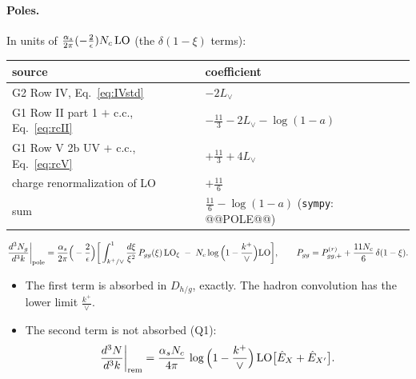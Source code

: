 \documentclass[10pt]{article}
\numberwithin{equation}{section}
\newcommand{\Lv}{L_{\vee}}
\newcommand{\Eh}{\hat E}
\begin{document}
\paragraph{Poles.} In units of $\frac{\alpha_s}{2\pi}(-\frac2\epsilon)N_c\,{\rm LO}$ (the $\delta(1-\xi)$ terms):
\begin{center}\small
\begin{tabular}{@{}ll@{}}\toprule
source & coefficient\\\midrule
G2 Row IV, Eq.~\eqref{eq:IVstd} & $-2\Lv$\\
G1 Row II part 1 $+$ c.c., Eq.~\eqref{eq:rcII} & $-\frac{11}{3}-2\Lv-\log(1-a)$\\
G1 Row V 2b UV $+$ c.c., Eq.~\eqref{eq:rcV} & $+\frac{11}{3}+4\Lv$\\
charge renormalization of LO & $+\frac{11}{6}$\\\midrule
sum & $\frac{11}{6}-\log(1-a)$ \quad(\texttt{sympy}: @@POLE@@)\\\bottomrule
\end{tabular}
\end{center}
\begin{equation}
\frac{d^3N_g}{d^3k}\bigg|_{\rm pole}=\frac{\alpha_s}{2\pi}\Big(-\frac{2}{\epsilon}\Big)\bigg[\int_{k^+/\vee}^1\frac{d\xi}{\xi^2}\,P_{gg}(\xi)\,{\rm LO}_\xi\;-\;N_c\log\Big(1-\frac{k^+}{\vee}\Big){\rm LO}\bigg],\qquad P_{gg}=P^{(r)}_{gg,+}+\frac{11N_c}{6}\,\delta(1-\xi).
\label{eq:pole}
\end{equation}
\begin{itemize}
\item The first term is absorbed in $D_{h/g}$, exactly. The hadron convolution has the lower limit $\frac{k^+}{\vee}$.
\item The second term is not absorbed (Q1):
\begin{equation}
\frac{d^3N}{d^3k}\bigg|_{\rm rem}=\frac{\alpha_sN_c}{4\pi}\,\log\Big(1-\frac{k^+}{\vee}\Big)\,{\rm LO}\big[\Eh_X+\Eh_{X'}\big].
\label{eq:rem}
\end{equation}
\end{itemize}
\end{document}
